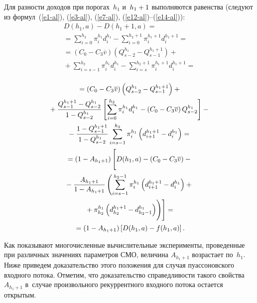 \begin{multicols}{2}
Для разности доходов при порогах~$h_1$ и~$h_1\hm+1$ выполняются 
равенства (следуют из формул~(\ref{e1-al}), (\ref{e3-al}), (\ref{e7-al}),  
(\ref{e12-al})--(\ref{e14-al})):
\begin{multline*}
D\left(h_1,a\right) -D\left(h_1+1,a\right)={}\\
{}=\sum\limits_{i=0}^{h_2} \pi_i^{h_1} d_i^{h_1} -
\sum\limits_{i=0}^{h_2+1} \pi_i^{h_1+1} d_i^{h_1+1} ={}\\
{}= \left( C_0-C_3\overline{v}\right) \left( Q^{h_1}_{s-2} -Q_{s-1}^{h_1+1}\right) 
+ {}\\
{}+ \sum\limits^{h_2}_{i=s-1} \pi_i^{h_1} d_i^{h_1} -\sum\limits_{i=s}^{h_2+1} 
\pi_i^{h_1+1} d_i^{h_1+1}={}\\
\end{multline*}

\noindent
\begin{multline*}
{}=
     \left( C_0-C_3\overline{v}\right) \left( Q^{h_1}_{s-2} -Q_{s-1}^{h_1+1}\right)+ {}\\
     {}+
\fr{Q_{s-1}^{h_1+1} -Q_{s-2}^{h_1}}{1-Q^{h_1}_{s-2}}\left[ 
\sum\limits_{i=0}^{h_2} \pi_i^{h_1} d_i^{h_1} -\left( C_0-C_3\overline{v}\right) 
Q^{h_1}_{s-2}\right]-{}\\
  {}- 
  \fr{1-Q_{s-1}^{h_1+1}}{1-Q^{h_1}_{s-2}} \sum\limits^{h_2}_{i=s-1} 
\pi_i^{h_1}\left( d_{i+1}^{h_1+1} -d_i^{h_1}\right) ={}\\
{}= \left( 1-A_{h_1+1}\right) 
\left[ 
\vphantom{\sum\limits_{h_2}^{h_2}}
D(h_1,a) -\left( C_0 -C_3\overline{v}\right) -{}\right.\\
{}- \fr{A_{h_1+1}}{1-A_{h_1+1}} 
\left( \sum\limits_{i=s-1}^{h_2-1}  \pi_i^{h_1}\left( d_{i+1}^{h_1+1} -
d_i^{h_1}\right) +{}\right.\\
\left.\left.{}+\pi_{h_2}^{h_1} \left( d_{h_2}^{h_1+1} -d^{h_1}_{h_2-1}\right)\!
\vphantom{\sum\limits_{h_2}^{h_2}}
\right)\right]={}\\
  {}=
  \left(1-A_{h_1+1}\right) \left[ D(h_1,a) -f(h_1,a)\right].
  \end{multline*}
  
Как показывают многочисленные вы\-чис\-ли\-тель\-ные эксперименты, проведенные 
при различных значениях па\-ра\-мет\-ров СМО, величина $A_{h_1+1}$ воз\-рас\-та\-ет 
по~$h_1$. Ниже приведем доказательство этого положения для случая 
пуассоновского входного потока. Отметим, что доказательство спра\-вед\-ли\-вости 
такого свойства~$A_{h_1+1}$ в~случае произвольного рекуррентного 
входного потока остается открытым.


\end{multicols}
